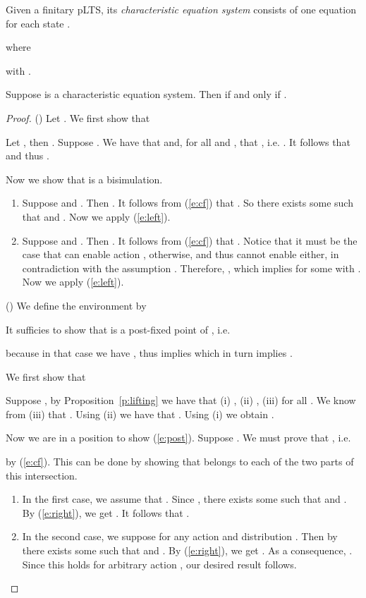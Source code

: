 \documentclass{article}
\begin{document}
\begin{definition}\label{d:cess}
Given a finitary  pLTS, its {\em characteristic equation system}
consists of one equation for each state .

where

with .
\end{definition}

\begin{theorem}\label{t:ces}
Suppose  is a characteristic equation system. Then  if
and only if .
\end{theorem}
\begin{proof}
() Let . We
  first show that

Let , then . Suppose
. We have that
 and, for all 
and , that ,
i.e. . It follows that  and thus
 .

Now we show that  is a bisimulation.
\begin{enumerate}
\item Suppose  and . Then
  . It follows from
  (\ref{e:cf}) that . So
  there exists some  such that  and
  . Now we apply (\ref{e:left}).

\item Suppose  and . Then
  . It follows from
  (\ref{e:cf}) that . Notice that it
  must be the case that  can enable action , otherwise,  and thus  cannot enable  either, in contradiction
  with the assumption . Therefore,
  ,
  which implies
   for some  with
  .
  Now we apply (\ref{e:left}).
\end{enumerate}

() We define the environment  by
 
 It sufficies to show that  is a post-fixed point of
 , i.e.

because in that case we have , thus   implies  which in turn implies .

We first show that

Suppose , by Proposition~\ref{p:lifting}
we have that (i) ,
(ii) , (iii)  for all . We know from (iii) that
. Using (ii) we have that
.
Using (i) we obtain .

Now we are in a position to show (\ref{e:post}). Suppose . We must prove that , i.e.

by (\ref{e:cf}). This can be done by showing that  belongs to
each of the two parts of this intersection.
\begin{enumerate}
\item In the first case, we assume that . Since , there exists some  such that  and
  . By (\ref{e:right}), we get
  . It follows that .

\item In the second case, we suppose  for any action  and distribution . Then by  there exists some
  such that    and . By (\ref{e:right}), we get
 . As a consequence,
 .
 Since this holds for arbitrary action , our desired result
 follows.
\end{enumerate}
\end{proof}
\end{document}
